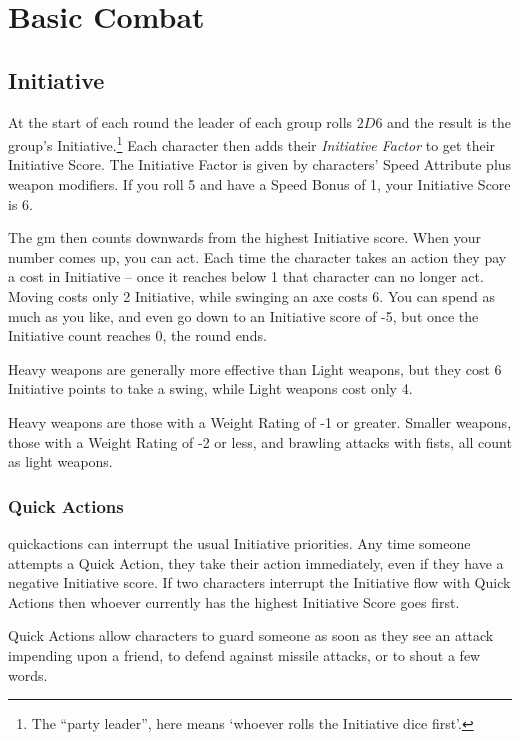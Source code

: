 \documentclass[titlepage,a4paper,openany]{book}
\begin{document}
\section{Basic Combat}

\begin{multicols}{2}

\subsection{Initiative}

At the start of each \gls{round} the leader of each group rolls $2D6$ and the result is the group's Initiative.\footnote{The ``party leader'', here means `whoever rolls the Initiative dice first'.}
Each character then adds their \textit{Initiative Factor} to get their Initiative Score.
The Initiative Factor is given by characters' Speed Attribute plus weapon modifiers.
If you roll 5 and have a Speed Bonus of 1, your Initiative Score is 6.

The \gls{gm} then counts downwards from the highest Initiative score.
When your number comes up, you can act.
Each time the character takes an action they pay a cost in Initiative -- once it reaches below 1 that character can no longer act.
Moving costs only 2 Initiative, while swinging an axe costs 6.
You can spend as much as you like, and even go down to an Initiative score of -5, but once the Initiative count reaches 0, the round ends.

Heavy weapons are generally more effective than Light weapons, but they cost 6 Initiative points to take a swing, while Light weapons cost only 4.

Heavy weapons are those with a Weight Rating of -1 or greater. Smaller weapons, those with a Weight Rating of -2 or less, and brawling attacks with fists, all count as light weapons.

\subsubsection{Quick Actions}

\Glspl{quickaction} can interrupt the usual Initiative priorities.
Any time someone attempts a Quick Action, they take their action immediately, even if they have a negative Initiative score.
If two characters interrupt the Initiative flow with Quick Actions then whoever currently has the highest Initiative Score goes first.

Quick Actions allow characters to guard someone as soon as they see an attack impending upon a friend, to defend against missile attacks, or to shout a few words.



\end{multicols}
\end{document}
